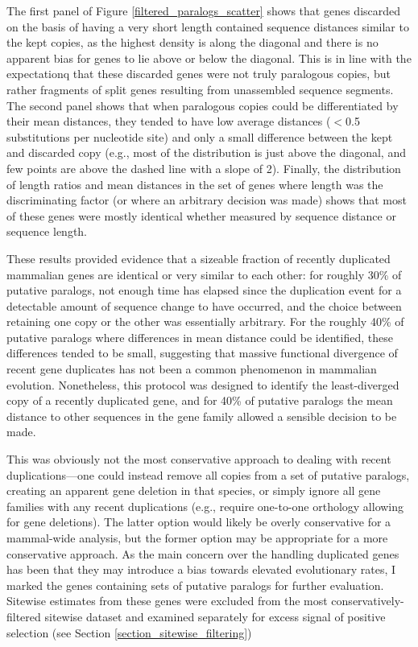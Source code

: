 The first panel of Figure \ref{filtered_paralogs_scatter} shows that
genes discarded on the basis of having a very short length contained
sequence distances similar to the kept copies, as the highest density
is along the diagonal and there is no apparent bias for genes to lie
above or below the diagonal. This is in line with the expectationq
that these discarded genes were not truly paralogous copies, but
rather fragments of split genes resulting from unassembled sequence
segments. The second panel shows that when paralogous copies could be
differentiated by their mean distances, they tended to have low
average distances ($<$0.5 substitutions per nucleotide site) and only
a small difference between the kept and discarded copy (e.g., most of
the distribution is just above the diagonal, and few points are above
the dashed line with a slope of 2). Finally, the distribution of
length ratios and mean distances in the set of genes where length was
the discriminating factor (or where an arbitrary decision was made)
shows that most of these genes were mostly identical whether measured
by sequence distance or sequence length.

These results provided evidence that a sizeable fraction of recently
duplicated mammalian genes are identical or very similar to each
other: for roughly 30\% of putative paralogs, not enough time has
elapsed since the duplication event for a detectable amount of
sequence change to have occurred, and the choice between retaining one
copy or the other was essentially arbitrary. For the roughly 40\% of
putative paralogs where differences in mean distance could be
identified, these differences tended to be small, suggesting that
massive functional divergence of recent gene duplicates has not been a
common phenomenon in mammalian evolution. Nonetheless, this protocol
was designed to identify the least-diverged copy of a recently
duplicated gene, and for 40\% of putative paralogs the mean distance
to other sequences in the gene family allowed a sensible decision to
be made.

This was obviously not the most conservative approach to dealing with
recent duplications---one could instead remove all copies from a set
of putative paralogs, creating an apparent gene deletion in that
species, or simply ignore all gene families with any recent
duplications (e.g., require one-to-one orthology allowing for gene
deletions). The latter option would likely be overly conservative for
a mammal-wide analysis, but the former option may be appropriate for a
more conservative approach. As the main concern over the handling
duplicated genes has been that they may introduce a bias towards
elevated evolutionary rates, I marked the genes containing sets of
putative paralogs for further evaluation. Sitewise estimates from
these genes were excluded from the most conservatively-filtered
sitewise dataset and examined separately for excess signal of positive
selection (see Section \ref{section_sitewise_filtering})

